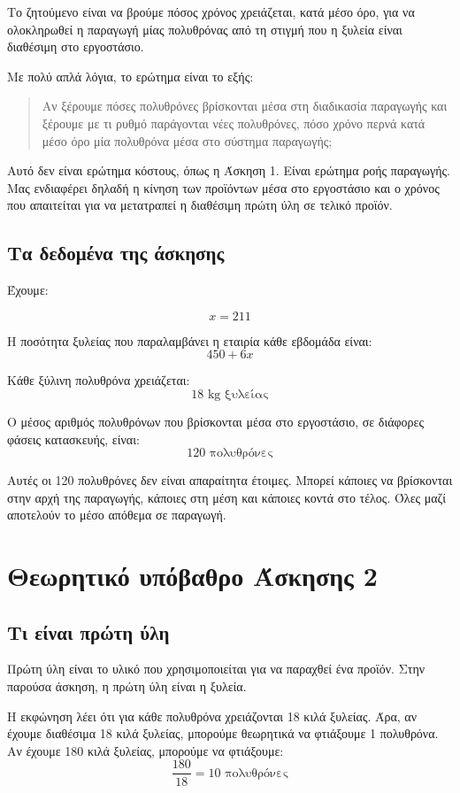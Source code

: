 \documentclass[12pt,a4paper]{article}
\begin{document}
Το ζητούμενο είναι να βρούμε πόσος χρόνος χρειάζεται, κατά μέσο όρο, για να ολοκληρωθεί η παραγωγή μίας πολυθρόνας από τη στιγμή που η ξυλεία είναι διαθέσιμη στο εργοστάσιο.

Με πολύ απλά λόγια, το ερώτημα είναι το εξής:

\begin{quote}
Αν ξέρουμε πόσες πολυθρόνες βρίσκονται μέσα στη διαδικασία παραγωγής και ξέρουμε με τι ρυθμό παράγονται νέες πολυθρόνες, πόσο χρόνο περνά κατά μέσο όρο μία πολυθρόνα μέσα στο σύστημα παραγωγής;
\end{quote}

Αυτό δεν είναι ερώτημα κόστους, όπως η Άσκηση 1. Είναι ερώτημα ροής παραγωγής. Μας ενδιαφέρει δηλαδή η κίνηση των προϊόντων μέσα στο εργοστάσιο και ο χρόνος που απαιτείται για να μετατραπεί η διαθέσιμη πρώτη ύλη σε τελικό προϊόν.

\subsection{Τα δεδομένα της άσκησης}

Έχουμε:

\[
x=211
\]

Η ποσότητα ξυλείας που παραλαμβάνει η εταιρία κάθε εβδομάδα είναι:
\[
450+6x
\]

Κάθε ξύλινη πολυθρόνα χρειάζεται:
\[
18 \text{ kg ξυλείας}
\]

Ο μέσος αριθμός πολυθρόνων που βρίσκονται μέσα στο εργοστάσιο, σε διάφορες φάσεις κατασκευής, είναι:
\[
120 \text{ πολυθρόνες}
\]

Αυτές οι 120 πολυθρόνες δεν είναι απαραίτητα έτοιμες. Μπορεί κάποιες να βρίσκονται στην αρχή της παραγωγής, κάποιες στη μέση και κάποιες κοντά στο τέλος. Όλες μαζί αποτελούν το μέσο απόθεμα σε παραγωγή.

\section{Θεωρητικό υπόβαθρο Άσκησης 2}

\subsection{Τι είναι πρώτη ύλη}

Πρώτη ύλη είναι το υλικό που χρησιμοποιείται για να παραχθεί ένα προϊόν. Στην παρούσα άσκηση, η πρώτη ύλη είναι η ξυλεία.

Η εκφώνηση λέει ότι για κάθε πολυθρόνα χρειάζονται 18 κιλά ξυλείας. Άρα, αν έχουμε διαθέσιμα 18 κιλά ξυλείας, μπορούμε θεωρητικά να φτιάξουμε 1 πολυθρόνα. Αν έχουμε 180 κιλά ξυλείας, μπορούμε να φτιάξουμε:
\[
\frac{180}{18}=10 \text{ πολυθρόνες}
\]
\end{document}
